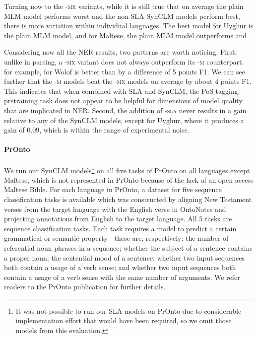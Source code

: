 \documentclass[11pt]{article}
\begin{document}
Turning now to the \textsc{-mx} variants, while it is still true that on average the plain MLM model performs worst and the non-SLA SynCLM models perform best, there is more variation within individual languages.
The best model for Uyghur is the plain MLM model, and for Maltese, the plain MLM model outperforms \mxt{} and \mxpt.

Considering now all the NER results, two patterns are worth noticing.
First, unlike in parsing, a \textsc{-mx} variant does not always outperform its \textsc{-m} counterpart: for example, \mp{} for Wolof is better than \mxp{} by a difference of 5 points F1.
We can see further that the \textsc{-m} models beat the \textsc{-mx} models on average by about 4 points F1. 
This indicates that when combined with SLA and SynCLM, the PoS tagging pretraining task does not appear to be helpful for dimensions of model quality that are implicated in NER.
Second, the addition of \mbox{\textsc{-sla}} never results in a gain relative to any of the SynCLM models, except for Uyghur, where it produces a gain of 0.09, which is within the range of experimental noise.

\paragraph{PrOnto}

We run our SynCLM models\footnote{It was not possible to run our SLA models on PrOnto due to considerable implementation effort that would have been required, so we omit those models from this evaluation.} on all five tasks of PrOnto \citep{gessler2023pronto} on all languages except Maltese, which is not represented in PrOnto because of the lack of an open-access Maltese Bible.
For each language in PrOnto, a dataset for five sequence classification tasks is available which was constructed by aligning New Testament verses from the target language with the English verse in OntoNotes \citep{hovy_ontonotes_2006} and projecting annotations from English to the target language. %
All 5 tasks are sequence classification tasks.
Each task requires a model to predict a certain grammatical or semantic property---these are, respectively: the number of referential noun phrases in a sequence; whether the subject of a sentence contains a proper noun; the sentential mood of a sentence; whether two input sequences both contain a usage of a verb sense; and whether two input sequences both contain a usage of a verb sense with the same number of arguments.
We refer readers to the PrOnto publication for further details.
\end{document}
